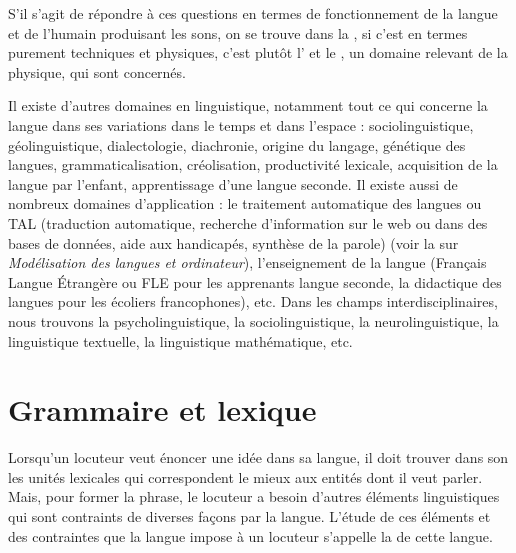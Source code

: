 {    S’il s’agit de répondre à ces questions en termes de fonctionnement de la langue et de l’humain produisant les sons, on se trouve dans la , si c’est en termes purement techniques et physiques, c’est plutôt l’ et le , un domaine relevant de la physique, qui sont concernés.

    Il existe d’autres domaines en linguistique, notamment tout ce qui concerne la langue dans ses variations dans le temps et dans l’espace : sociolinguistique, géolinguistique, dialectologie, diachronie, origine du langage, génétique des langues, grammaticalisation, créolisation, productivité lexicale, acquisition de la langue par l’enfant, apprentissage d’une langue seconde. Il existe aussi de nombreux domaines d’application : le traitement automatique des langues ou TAL (traduction automatique, recherche d’information sur le web ou dans des bases de données, aide aux handicapés, synthèse de la parole) (voir la  sur \textit{Modélisation des langues et ordinateur}), l’enseignement de la langue (Français Langue Étrangère ou FLE pour les apprenants langue seconde, la didactique des langues pour les écoliers francophones), etc. Dans les champs interdisciplinaires, nous trouvons la psycholinguistique, la sociolinguistique, la neurolinguistique, la linguistique textuelle, la linguistique mathématique, etc.
}

\section{Grammaire et lexique}\label{sec:0.0.5}

Lorsqu’un locuteur veut énoncer une idée dans sa langue, il doit trouver dans son  les unités lexicales qui correspondent le mieux aux entités dont il veut parler. Mais, pour former la phrase, le locuteur a besoin d’autres éléments linguistiques qui sont contraints de diverses façons par la langue. L’étude de ces éléments et des contraintes que la langue impose à un locuteur s’appelle la  de cette langue.

